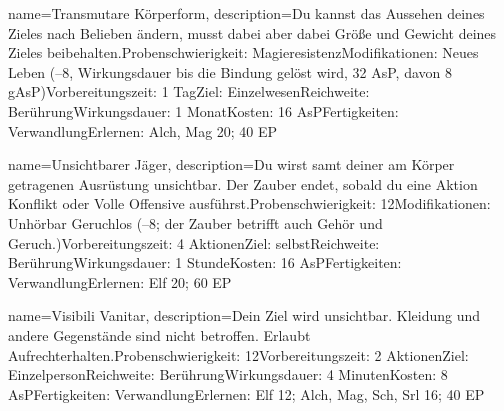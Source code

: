 {
    name={Transmutare Körperform},
    description={Du kannst das Aussehen deines Zieles nach Belieben ändern, musst dabei aber dabei Größe und Gewicht deines Zieles beibehalten.\newline Probenschwierigkeit: Magieresistenz\newline Modifikationen: Neues Leben (–8, Wirkungsdauer bis die Bindung gelöst wird, 32 AsP, davon 8 gAsP)\newline Vorbereitungszeit: 1 Tag\newline Ziel: Einzelwesen\newline Reichweite: Berührung\newline Wirkungsdauer: 1 Monat\newline Kosten: 16 AsP\newline Fertigkeiten: Verwandlung\newline Erlernen: Alch, Mag 20; 40 EP}
}


{
    name={Unsichtbarer Jäger},
    description={Du wirst samt deiner am Körper getragenen Ausrüstung unsichtbar. Der Zauber endet, sobald du eine Aktion Konflikt oder Volle Offensive ausführst.\newline Probenschwierigkeit: 12\newline Modifikationen: Unhörbar Geruchlos (–8; der Zauber betrifft auch Gehör und Geruch.)\newline Vorbereitungszeit: 4 Aktionen\newline Ziel: selbst\newline Reichweite: Berührung\newline Wirkungsdauer: 1 Stunde\newline Kosten: 16 AsP\newline Fertigkeiten: Verwandlung\newline Erlernen: Elf 20; 60 EP}
}


{
    name={Visibili Vanitar},
    description={Dein Ziel wird unsichtbar. Kleidung und andere Gegenstände sind nicht betroffen. Erlaubt Aufrechterhalten.\newline Probenschwierigkeit: 12\newline Vorbereitungszeit: 2 Aktionen\newline Ziel: Einzelperson\newline Reichweite: Berührung\newline Wirkungsdauer: 4 Minuten\newline Kosten: 8 AsP\newline Fertigkeiten: Verwandlung\newline Erlernen: Elf 12; Alch, Mag, Sch, Srl 16; 40 EP}
}



